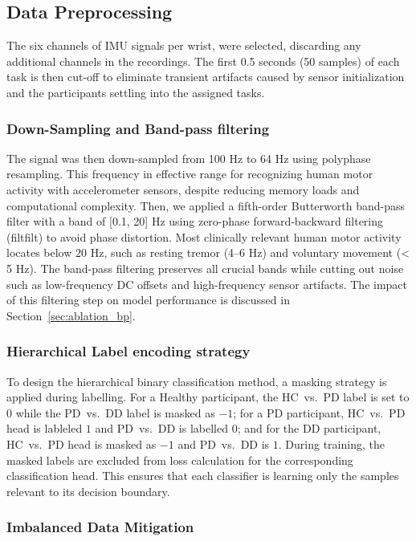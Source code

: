\documentclass[pmlr]{jmlr}
\begin{document}
\subsection{Data Preprocessing}

 The six channels of IMU signals per wrist, were selected, discarding any additional channels in the recordings. The first 0.5 seconds (50 samples) of each task is then cut-off to eliminate transient artifacts caused by sensor initialization and the participants settling into the assigned tasks.

\subsubsection{Down-Sampling and Band-pass filtering}
\label{sec:windowing}
 The signal was then down-sampled from 100 Hz to 64 Hz using polyphase resampling. This frequency in effective range for recognizing human motor activity with accelerometer sensors, despite reducing memory loads and computational complexity. 
Then, we applied a fifth-order Butterworth band-pass filter with a band of [0.1, 20] Hz using zero-phase forward-backward filtering (filtfilt) to avoid phase distortion. Most clinically relevant human motor activity locates below 20 Hz, such as resting tremor (4–6 Hz) and voluntary movement (< 5 Hz). The band-pass filtering preserves all crucial bands while cutting out noise such as low-frequency DC offsets and high-frequency sensor artifacts. 
The impact of this filtering step on model performance is discussed in Section~\ref{sec:ablation_bp}.

\subsubsection{Hierarchical Label encoding strategy}
\label{sec:masking} 
To design the hierarchical binary classification method, a masking strategy is applied during labelling. For a Healthy participant, the HC~vs.~PD label is set to $0$ while the PD~vs.~DD label is masked as $-1$; for a PD
participant, HC~vs.~PD head is lableled $1$ and PD~vs.~DD is labelled $0$; and for the DD
participant, HC~vs.~PD head is masked as $-1$ and PD~vs.~DD is $1$.
During training, the masked labels are excluded from loss calculation for the corresponding classification head. This ensures that each classifier is learning only the samples relevant to its decision boundary.  

 
\subsubsection{Imbalanced Data Mitigation}
\label{sec:windowing}
 
\end{document}

